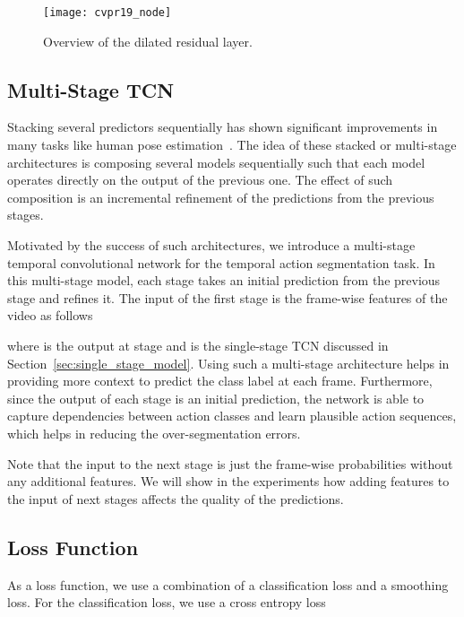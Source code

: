 \documentclass[10pt,twocolumn,letterpaper]{article}
\begin{document}
\begin{figure}[tb]
\begin{center}
   \texttt{[image: cvpr19\_node]}
\end{center}
   \caption{Overview of the dilated residual layer.}
\label{fig:layer}
\end{figure}


\subsection{Multi-Stage TCN}
\label{sec:multi_stage_model}
Stacking several predictors sequentially has shown significant 
improvements in many tasks like human pose estimation~\cite{wei2016convolutional, 
newell2016stacked}. The idea of these stacked or multi-stage architectures 
is composing several models sequentially such that each model operates directly on 
the output of the previous one. The effect of such composition is 
an incremental refinement of the predictions from the previous stages. 

Motivated by the success of such architectures, we introduce a multi-stage 
temporal convolutional network for the temporal action segmentation
task. In this multi-stage model, each stage takes an initial prediction from 
the previous stage and refines it. The input of the first stage is the 
frame-wise features of the video as follows

where  is the output at stage  and  is the single-stage TCN 
discussed in Section~\ref{sec:single_stage_model}. Using such a multi-stage 
architecture helps in providing more context to predict the class label at each 
frame. Furthermore, since the output of each stage is an initial prediction, 
the network is able to capture dependencies between action classes and learn 
plausible action sequences, which helps in reducing the over-segmentation errors.

Note that the input to the next stage is just the frame-wise probabilities without 
any additional features. We will show in the experiments how adding features to the 
input of next stages affects the quality of the predictions.


\subsection{Loss Function}
\label{sec:loss_function}

As a loss function, we use a combination of a classification loss and a smoothing 
loss. For the classification loss, we use a cross entropy loss
\end{document}
